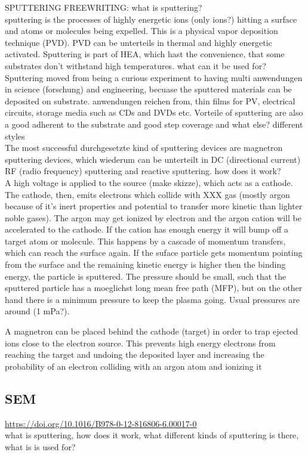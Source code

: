 SPUTTERING FREEWRITING: 
what is sputtering? \\
sputtering is the processes of highly energetic ions (only ions?) hitting a surface and atoms or molecules being expelled. 
This is a physical vapor deposition technique (PVD). PVD can be unterteils in thermal and highly energetic activated. Sputtering is part of HEA, which hast the convenience, that some substrates don't withstand high temperatures. 
what can it be used for?\\
Sputtering moved from being a curious experiment to having multi anwendungen in science (forschung) and engineering, becuase the sputtered materials can be deposited on  substrate. 
anwendungen reichen from, thin films for PV, electrical circuits, storage media such as CDs and DVDs etc. 
Vorteile of sputtering are also a good adherent to the substrate and good step coverage and what else? 
different styles\\
The most successful durchgesetzte kind of sputtering devices are magnetron sputtering devices, which wiederum can be unterteilt in DC (directional current) RF (radio frequency) sputtering and reactive sputtering. 
how does it work? \\
A high voltage is applied to the source (make skizze), which acts as a cathode. 
The cathode, then, emits electrons which collide with XXX gas (mostly argon because of it's inert properties and potential to transfer more kinetic than lighter noble gases). 
The argon may get ionized by electron and the argon cation will be accelerated to the cathode. If the cation has enough energy it will bump off a target atom or molecule. 
This happens by a cascade of momentum transfers, which can reach the surface again. 
If the suface particle gets momentum pointing from the surface and the remaining kinetic energy is higher then the binding energy, the particle is sputtered. 
The pressure should be small, such that the sputtered particle has a moeglichst long mean free path (MFP), but on the other hand there is a minimum pressure to keep the plasma going. 
Usual pressures are around (1 mPa?).

A magnetron can be placed behind the cathode (target) in order to trap ejected ions close to the electron source. 
This prevents high energy electrons from reaching the target and undoing the deposited layer and increasing the probability of an electron colliding with an argon atom and ionizing it 

\subsection{SEM}
\url{https://doi.org/10.1016/B978-0-12-816806-6.00017-0}\\
what is sputtering, 
how does it work, 
what different kinds of sputtering is there, 
what is is used for? 
\cite{McMullan1995}
\cite{Vernon2000}
\cite{Kaliva2020}


